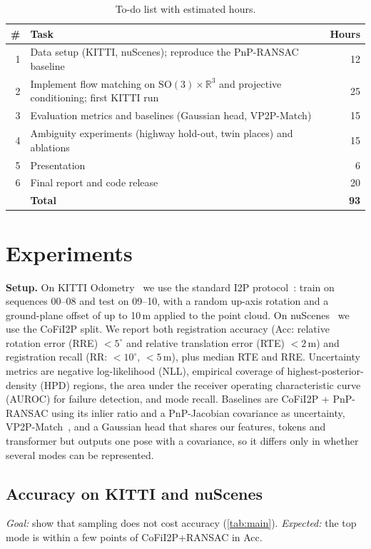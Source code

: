 \documentclass{article}
\newcommand{\R}{\mathbb{R}}
\newcommand{\SO}{\mathrm{SO}(3)}
\begin{document}
\begin{table}[t]
\centering\scriptsize
\caption{To-do list with estimated hours.}
\label{tab:todo}
\begin{tabular}{@{}rlr@{}}
\toprule
\# & Task & Hours \\
\midrule
1 & Data setup (KITTI, nuScenes); reproduce the PnP-RANSAC baseline & 12\\
2 & Implement flow matching on $\SO\times\R^3$ and projective conditioning; first KITTI run & 25\\
3 & Evaluation metrics and baselines (Gaussian head, VP2P-Match) & 15\\
4 & Ambiguity experiments (highway hold-out, twin places) and ablations & 15\\
5 & Presentation & 6\\
6 & Final report and code release & 20\\
\midrule
 & \textbf{Total} & \textbf{93} \\
\bottomrule
\end{tabular}
\end{table}

\section{Experiments}
\label{sec:exp}

\textbf{Setup.}
On KITTI Odometry~\cite{geiger2012kitti} we use the standard I2P protocol~\cite{ren2022corri2p,kang2024cofii2p}: train on sequences 00--08 and test on 09--10, with a random up-axis rotation and a ground-plane offset of up to 10\,m applied to the point cloud.
On nuScenes~\cite{caesar2020nuscenes} we use the CoFiI2P split.
We report both registration accuracy (Acc: relative rotation error (RRE) $<5^\circ$ and relative translation error (RTE) $<2$\,m) and registration recall (RR: $<10^\circ$, $<5$\,m), plus median RTE and RRE.
Uncertainty metrics are negative log-likelihood (NLL), empirical coverage of highest-posterior-density (HPD) regions, the area under the receiver operating characteristic curve (AUROC) for failure detection, and mode recall.
Baselines are CoFiI2P + PnP-RANSAC using its inlier ratio and a PnP-Jacobian covariance as uncertainty, VP2P-Match~\cite{zhou2023vp2p}, and a Gaussian head that shares our features, tokens and transformer but outputs one pose with a covariance, so it differs only in whether several modes can be represented.

\subsection{Accuracy on KITTI and nuScenes}
\emph{Goal:} show that sampling does not cost accuracy (\cref{tab:main}).
\emph{Expected:} the top mode is within a few points of CoFiI2P+RANSAC in Acc.
\end{document}

